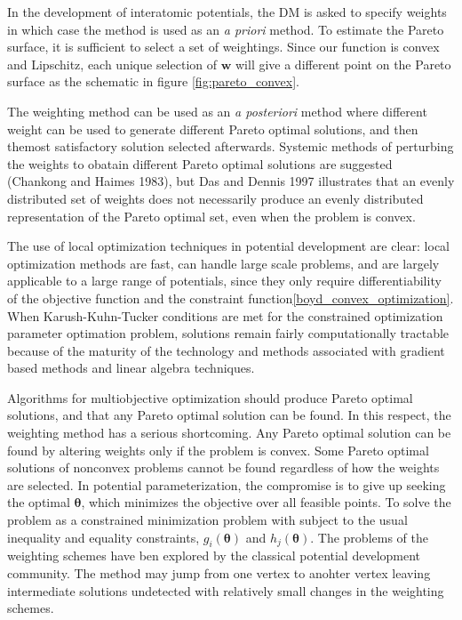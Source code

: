In the development of interatomic potentials, the DM is asked to specify weights in which case the method is used as an \emph{a priori} method.
To estimate the Pareto surface, it is sufficient to select a set of weightings.  Since our function is convex and Lipschitz, each unique selection of $\bm{w}$ will give a different point on the Pareto surface as the schematic in figure \ref{fig:pareto_convex}.

The weighting method can be used as an \emph{a posteriori} method where different weight can be used to generate different Pareto optimal solutions, and then themost satisfactory solution selected afterwards.  Systemic methods of perturbing the weights to obatain different Pareto optimal solutions are suggested (Chankong and Haimes 1983), but Das and Dennis 1997 illustrates that an evenly distributed set of weights does not necessarily produce an evenly distributed representation of the Pareto optimal set, even when the problem is convex.

The use of local optimization techniques in potential development are clear: local optimization methods are fast, can handle large scale problems, and are largely applicable to a large range of potentials, since they only require differentiability of the objective function and the constraint function\ref{boyd_convex_optimization}.  When Karush-Kuhn-Tucker conditions\cite{karush1939_kkt,kuhn1951_kkt} are met for the constrained optimization parameter optimation problem, solutions remain fairly computationally tractable because of the maturity of the technology and methods associated with gradient based methods and linear algebra techniques.

Algorithms for multiobjective optimization should produce Pareto optimal solutions, and that any Pareto optimal solution can be found.  In this respect, the weighting method has a serious shortcoming.  Any Pareto optimal solution can be found by altering weights only if the problem is convex.  Some Pareto optimal solutions of nonconvex problems cannot be found regardless of how the weights are selected.  In potential parameterization, the compromise is to give up seeking the optimal $\bm{\theta}$, which minimizes the objective over all feasible points.  To solve the problem as a constrained minimization problem with subject to the usual inequality and equality constraints, $g_i(\bm{\theta})$ and $h_j(\bm{\theta})$.  The problems of the weighting schemes have ben explored by the classical potential development community.\cite{martinez2013_fitting}  The method may jump from one vertex to anohter vertex leaving intermediate solutions undetected with relatively small changes in the weighting schemes.\cite{martinez2013_fitting}

